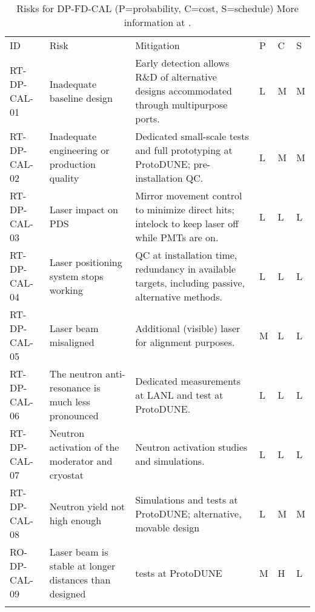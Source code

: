 
\begin{footnotesize}
\begin{longtable}{x{0.18\textwidth}x{0.20\textwidth}x{0.32\textwidth}x{0.02\textwidth}x{0.02\textwidth}x{0.02\textwidth}} 
\caption[Risks for DP-FD-CAL]{Risks for DP-FD-CAL (P=probability, C=cost, S=schedule) More information at . } \\
ID & Risk & Mitigation & P & C & S  \\  \colhline
RT-DP-CAL-01 & Inadequate baseline design & Early detection allows R\&D of alternative designs accommodated through multipurpose ports. & L & M & M \\  \colhline
RT-DP-CAL-02 & Inadequate engineering or production quality & Dedicated small-scale tests and full prototyping at ProtoDUNE; pre-installation QC. & L & M & M \\  \colhline
RT-DP-CAL-03 & Laser impact on PDS & Mirror movement control to minimize direct hits; intelock to keep laser off while PMTs are on. & L & L & L \\  \colhline
RT-DP-CAL-04 & Laser positioning system stops working & QC at installation time, redundancy in available targets, including passive, alternative methods. & L & L & L \\  \colhline
RT-DP-CAL-05 & Laser beam misaligned & Additional (visible) laser for alignment purposes. & M & L & L \\  \colhline
RT-DP-CAL-06 & The neutron anti-resonance is much less pronounced & Dedicated measurements at LANL and test at ProtoDUNE. & L & L & L \\  \colhline
RT-DP-CAL-07 & Neutron activation of the moderator and cryostat & Neutron activation studies and simulations. & L & L & L \\  \colhline
RT-DP-CAL-08 & Neutron yield not high enough & Simulations and tests at ProtoDUNE; alternative, movable design & L & M & M \\  \colhline
RO-DP-CAL-09 & Laser beam is stable at longer distances than designed & tests at ProtoDUNE & M & H & L \\  \colhline

\label{tab:risks:DP-FD-CAL}
\end{longtable}
\end{footnotesize}